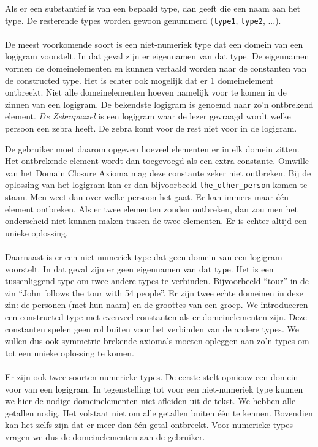 Als er een substantief is van een bepaald type, dan geeft die een naam aan het type. De resterende types worden gewoon genummerd (\texttt{type1}, \texttt{type2}, ...).

\paragraph{} De meest voorkomende soort is een niet-numeriek type dat een domein van een logigram voorstelt. In dat geval zijn er eigennamen van dat type. De eigennamen vormen de domeinelementen en kunnen vertaald worden naar de constanten van de constructed type. Het is echter ook mogelijk dat er 1 domeinelement ontbreekt. Niet alle domeinelementen hoeven namelijk voor te komen in de zinnen van een logigram. De bekendste logigram is genoemd naar zo'n ontbrekend element. \textit{De Zebrapuzzel} is een logigram waar de lezer gevraagd wordt welke persoon een zebra heeft. De zebra komt voor de rest niet voor in de logigram.

De gebruiker moet daarom opgeven hoeveel elementen er in elk domein zitten. Het ontbrekende element wordt dan toegevoegd als een extra constante. Omwille van het Domain Closure Axioma mag deze constante zeker niet ontbreken. Bij de oplossing van het logigram kan er dan bijvoorbeeld \texttt{the\_other\_person} komen te staan. Men weet dan over welke persoon het gaat. Er kan immers maar één element ontbreken. Als er twee elementen zouden ontbreken, dan zou men het onderscheid niet kunnen maken tussen de twee elementen. Er is echter altijd een unieke oplossing.

\paragraph{} Daarnaast is er een niet-numeriek type dat geen domein van een logigram voorstelt. In dat geval zijn er geen eigennamen van dat type. Het is een tussenliggend type om twee andere types te verbinden. Bijvoorbeeld ``tour'' in de zin ``John follows the tour with 54 people''. Er zijn twee echte domeinen in deze zin: de personen (met hun naam) en de groottes van een groep. We introduceren een constructed type met evenveel constanten als er domeinelementen zijn. Deze constanten spelen geen rol buiten voor het verbinden van de andere types. We zullen dus ook symmetrie-brekende axioma's moeten opleggen aan zo'n types om tot een unieke oplossing te komen.

\paragraph{} Er zijn ook twee soorten numerieke types. De eerste stelt opnieuw een domein voor van een logigram. In tegenstelling tot voor een niet-numeriek type kunnen we hier de nodige domeinelementen niet afleiden uit de tekst. We hebben alle getallen nodig. Het volstaat niet om alle getallen buiten één te kennen. Bovendien kan het zelfs zijn dat er meer dan één getal ontbreekt. Voor numerieke types vragen we dus de domeinelementen aan de gebruiker.

